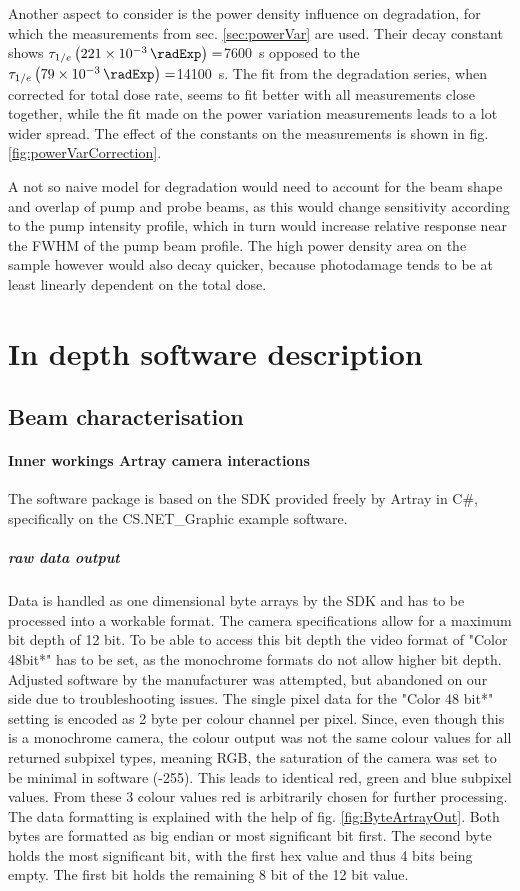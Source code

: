 \documentclass[twoside,openright]{scrreprt}
\begin{document}
Another aspect to consider is the power density influence on degradation, for which the measurements from sec. \ref{sec:powerVar} are used.  Their decay constant shows $\tau_{1/e}\left(\SI{221e-3}{\radExp}\right)=$\SI{7600}{\second}  opposed to the $\tau_{1/e}\left(\SI{79e-3}{\radExp}\right)=$\SI{14100}{\second}. The fit from the degradation series, when corrected for total dose rate, seems to fit better with all measurements close together, while the fit made on the power variation measurements leads to a lot wider spread. The effect of the constants on the measurements is shown in fig. \ref{fig:powerVarCorrection}.

A not so naive model for degradation would need to account for the beam shape and overlap of pump and probe beams, as this would change sensitivity according to the pump intensity profile, which in turn would increase relative response near the FWHM of the pump beam profile. The high power density area on the sample however would also decay quicker, because photodamage tends to be at least linearly dependent on the total dose.


\chapter{In depth software description}
\section{Beam characterisation}
\subsubsection{Inner workings Artray camera interactions}
The software package is based on the SDK provided freely by Artray in C\#, specifically on the CS.NET\_Graphic example software. 

\paragraph{raw data output}
Data is handled as one dimensional byte arrays by the SDK and has to be processed into a workable format. The camera specifications allow for a maximum bit depth of 12 bit. To be able to access this bit depth the video format of "Color 48bit*" has to be set, as the monochrome formats do not allow higher bit depth. Adjusted software by the manufacturer was attempted, but abandoned on our side due to troubleshooting issues. The single pixel data for the "Color 48 bit*" setting is encoded as 2 byte per colour channel per pixel. Since, even though this is a monochrome camera, the colour output was not the same colour values for all returned subpixel types, meaning RGB, the saturation of the camera was set to be minimal in software (-255). This leads to identical red, green and blue subpixel values. From these 3 colour values red is arbitrarily chosen for further processing.
The data formatting is explained with the help of fig. \ref{fig:ByteArtrayOut}. Both bytes are formatted as big endian or most significant bit first. The second byte holds the most significant bit, with the first hex value and thus 4 bits being empty. The first bit holds the remaining 8 bit of the 12 bit value.
\end{document}
